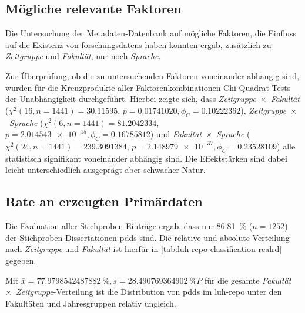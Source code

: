 \subsection{Mögliche relevante Faktoren}\label{sec:luh-repo-results-factors}
Die Untersuchung der Metadaten-Datenbank auf mögliche Faktoren, die Einfluss auf die Existenz von \glspl{forschungsdaten} haben könnten ergab, zusätzlich zu \textit{Zeitgruppe} und \textit{Fakultät}, nur noch \textit{Sprache}.

Zur Überprüfung, ob die zu untersuchenden Faktoren voneinander abhängig sind, wurden für die Kreuzprodukte aller Faktorenkombinationen Chi-Quadrat Tests der Unabhängigkeit durchgeführt.
Hierbei zeigte sich, dass \textit{Zeitgruppe}~$\times$~\textit{Fakultät} ($\chi^2 (\num{16}, n=\num{1441}) = \num[round-mode=places,round-precision=2]{30.11595}$, $p = \num[round-mode=places,round-precision=2]{0.01741020},\phi_C=\num[round-mode=places,round-precision=2]{0.10222362}$), \textit{Zeitgruppe}~$\times$~\textit{Sprache} ($\chi^2 (\num{6}, n=\num{1441}) = \num[round-mode=places,round-precision=2]{81.2042334}$, $p = \num[round-mode=places,round-precision=2]{2.014543e-15}, \phi_C=\num[round-mode=places,round-precision=2]{0.16785812}$) und \textit{Fakultät}~$\times$~\textit{Sprache} ($\chi^2 (\num{24}, n=\num{1441}) = \num[round-mode=places,round-precision=2]{239.3091384}$, $p = \num[round-mode=places,round-precision=2]{2.148979e-37},\phi_C=\num[round-mode=places,round-precision=2]{0.23528109}$) alle statistisch signifikant voneinander abhängig sind.
Die Effektstärken sind dabei leicht unterschiedlich ausgeprägt aber schwacher Natur.

\subsection{Rate an erzeugten Primärdaten}\label{sec:luh-repo-results-pd}
Die Evaluation aller Stichproben-Einträge ergab, dass nur \SI[round-mode=places,round-precision=2]{86,81}{\percent} ($n=\num{1252}$) der Stichproben-Dissertationen \glspl{pdd} sind.
Die relative und absolute Verteilung nach \textit{Zeitgruppe} und \textit{Fakultät} ist hierfür in \cref{tab:luh-repo-classification-realrd} gegeben.
\begin{table}[!htbp]
	\caption{Anteil an \glspl{pdd} aus der Stichprobe.
    Angaben relativ zu der respektiven \textit{Fakultät}~$\times$~\textit{Zeitgruppe}-Gesamtanzahl.
    Absolute Werte in Klammern angegeben.}
    
    \label{tab:luh-repo-classification-realrd}
\end{table}
Mit $\bar{x}=\SI[round-mode=places,round-precision=2]{77.9798542487882}{\percent},s=\SI[round-mode=places,round-precision=2]{28.490769364902}{\percent P}$ für die gesamte \textit{Fakultät}~$\times$~\textit{Zeitgruppe}-Verteilung ist die Distribution von \glspl{pdd} im \gls{luh-repo} unter den Fakultäten und Jahresgruppen relativ ungleich.

